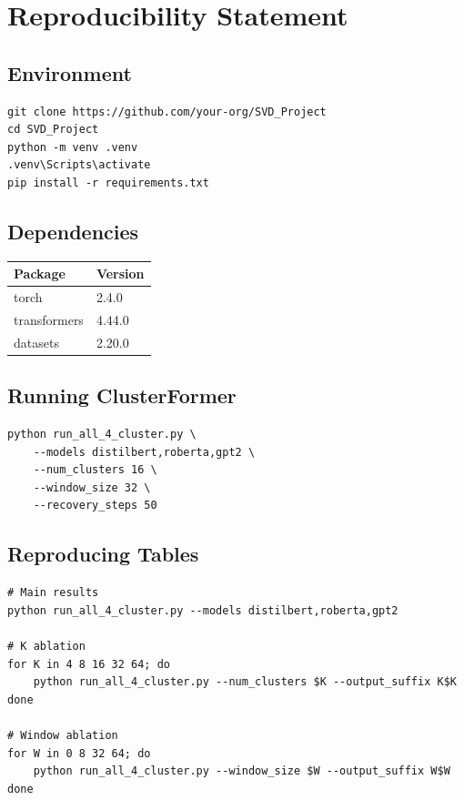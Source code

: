 \section{Reproducibility Statement}

\subsection{Environment}

\begin{lstlisting}
git clone https://github.com/your-org/SVD_Project
cd SVD_Project
python -m venv .venv
.venv\Scripts\activate
pip install -r requirements.txt
\end{lstlisting}

\subsection{Dependencies}

\begin{table}[H]
\centering
\small
\begin{tabular}{ll}
\toprule
\textbf{Package} & \textbf{Version} \\
\midrule
torch & 2.4.0 \\
transformers & 4.44.0 \\
datasets & 2.20.0 \\
\bottomrule
\end{tabular}
\end{table}

\subsection{Running ClusterFormer}

\begin{lstlisting}
python run_all_4_cluster.py \
    --models distilbert,roberta,gpt2 \
    --num_clusters 16 \
    --window_size 32 \
    --recovery_steps 50
\end{lstlisting}

\subsection{Reproducing Tables}

\begin{lstlisting}
# Main results
python run_all_4_cluster.py --models distilbert,roberta,gpt2

# K ablation
for K in 4 8 16 32 64; do
    python run_all_4_cluster.py --num_clusters $K --output_suffix K$K
done

# Window ablation
for W in 0 8 32 64; do
    python run_all_4_cluster.py --window_size $W --output_suffix W$W
done
\end{lstlisting}

